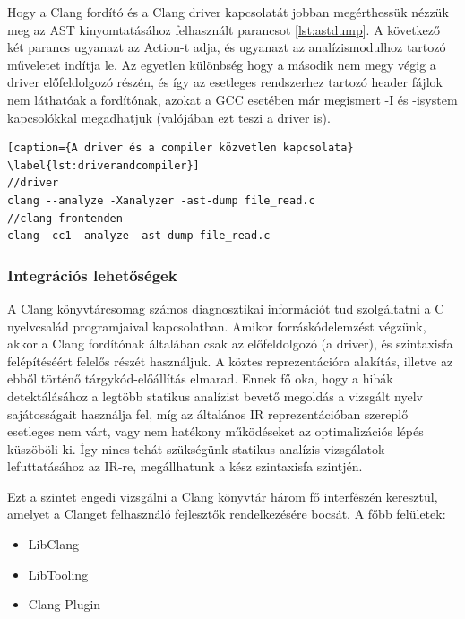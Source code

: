 \documentclass[a4paper,12pt]{report}
\begin{document}
Hogy a Clang fordító és a Clang driver kapcsolatát jobban megérthessük nézzük meg az AST kinyomtatásához felhasznált parancsot \ref{lst:astdump}. A következő két parancs ugyanazt az Action-t adja, és ugyanazt az analízismodulhoz tartozó műveletet indítja le. Az egyetlen különbség hogy a második nem megy végig a driver előfeldolgozó részén, és így az esetleges rendszerhez tartozó header fájlok nem láthatóak a fordítónak, azokat a GCC esetében már megismert -I és -isystem kapcsolókkal megadhatjuk (valójában ezt teszi a driver is).

\begin{lstlisting}[caption={A driver és a compiler közvetlen kapcsolata}
\label{lst:driverandcompiler}]
//driver
clang --analyze -Xanalyzer -ast-dump file_read.c
//clang-frontenden
clang -cc1 -analyze -ast-dump file_read.c
\end{lstlisting}

\subsubsection{Integrációs lehetőségek}
A Clang könyvtárcsomag számos diagnosztikai információt tud szolgáltatni a C nyelvcsalád programjaival kapcsolatban. Amikor forráskódelemzést végzünk, akkor a Clang fordítónak általában csak az előfeldolgozó (a driver), és szintaxisfa felépítéséért felelős részét használjuk. A köztes reprezentációra alakítás, illetve az ebből történő tárgykód-előállítás elmarad. Ennek fő oka, hogy a hibák detektálásához a legtöbb statikus analízist bevető megoldás a vizsgált nyelv sajátosságait használja fel, míg az általános IR reprezentációban szereplő esetleges nem várt, vagy nem hatékony működéseket az optimalizációs lépés küszöböli ki. Így nincs tehát szükségünk statikus analízis vizsgálatok lefuttatásához az IR-re, megállhatunk a kész szintaxisfa szintjén.

Ezt a szintet engedi vizsgálni a Clang könyvtár három fő interfészén keresztül, amelyet a Clanget felhasználó fejlesztők rendelkezésére bocsát. A főbb felületek:
\begin{itemize}
\item LibClang
\item LibTooling
\item Clang Plugin
\end{itemize}
\end{document}
